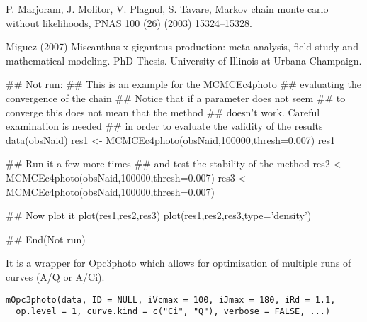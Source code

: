 \documentclass[letterpaper]{book}
\begin{document}
%
\begin{References}\relax
P. Marjoram, J. Molitor, V. Plagnol, S. Tavare, Markov
chain monte carlo without likelihoods, PNAS 100 (26) (2003)
15324--15328.

Miguez (2007) Miscanthus x giganteus production:
meta-analysis, field study and mathematical modeling. PhD
Thesis. University of Illinois at Urbana-Champaign.
\end{References}
%
\begin{Examples}
\begin{ExampleCode}
## Not run: 
## This is an example for the MCMCEc4photo
## evaluating the convergence of the chain
## Notice that if a parameter does not seem
## to converge this does not mean that the method
## doesn't work. Careful examination is needed
## in order to evaluate the validity of the results
data(obsNaid)
res1 <- MCMCEc4photo(obsNaid,100000,thresh=0.007)
res1

## Run it a few more times
## and test the stability of the method
res2 <- MCMCEc4photo(obsNaid,100000,thresh=0.007)
res3 <- MCMCEc4photo(obsNaid,100000,thresh=0.007)

## Now plot it
plot(res1,res2,res3)
plot(res1,res2,res3,type='density')

## End(Not run)
\end{ExampleCode}
\end{Examples}
%
\begin{Description}\relax
It is a wrapper for Opc3photo which allows for optimization
of multiple runs of curves (A/Q or A/Ci).
\end{Description}
%
\begin{Usage}
\begin{verbatim}
mOpc3photo(data, ID = NULL, iVcmax = 100, iJmax = 180, iRd = 1.1,
  op.level = 1, curve.kind = c("Ci", "Q"), verbose = FALSE, ...)
\end{verbatim}
\end{Usage}
%
\end{document}
